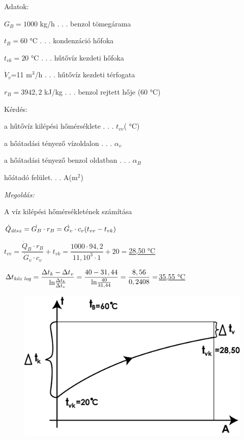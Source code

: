 \vspace{5mm}
\noindent
Adatok: 

$G_B=1000$ kg/h . . . benzol tömegárama

$t_B=60$ °C . . . kondenzáció hőfoka

$t_{vk}=20$ °C . . . hűtővíz kezdeti hőfoka

$\dot{V}_v$=11 m$^3$/h . . . hűtővíz kezdeti térfogata

$r_B=3942,2$ kJ/kg . . . benzol rejtett hője (60 °C)


\vspace{5mm}
\noindent
Kérdés: 

a hűtővíz kilépési hőmérséklete . . . $t_{vv}$( °C)

a hőátadási tényező vízoldalon . . . $\alpha_v$ 

a hőátadási tényező benzol oldatban . . . $\alpha_B$

hőátadó felület. . . A(m$^2$)

\vspace{5mm}
\noindent
\textit{Megoldás:}

A víz kilépési hőmérsékletének számítása	

\vspace{5mm}
$\dot{Q}_{\textmd{\textit{á}}tsz}=\dot{G_B}\cdot r_B=\dot{G_v}\cdot c_v (t_{vv}-t_{vk})$

\vspace{5mm}
$t_{vv}=\dfrac{\dot{Q}_B\cdot r_B}{\dot{G}_v\cdot c_v}+t_{vk}=\dfrac{1000\cdot94,2}{11,10^3\cdot1}+20=$\underline{28,50 °C}

\vspace{5mm}
$\Delta t_{\textmd{\textit{köz log}}}=\dfrac{\Delta t_k-\Delta t_v}{\textmd{ln}\frac{\Delta t_k}{\Delta t_v}}=\dfrac{40-31,44}{\textmd{ln}\frac{40}{31,44}}=\dfrac{8,56}{0,2408}=$\underline{35,55 °C}


\begin{figure}[H]
	\begin{center}
		\includegraphics[width=0.5\linewidth]{u9awby123/fig02.png}
	\end{center}
\end{figure}


